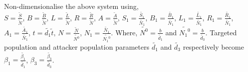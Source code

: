 \documentclass[conference]{IEEEtran}
\begin{document}
\noindent Non-dimensionalise the above system using,\\
\noindent
$S=\frac{\tilde{S}}{\tilde{N}}$, $B=\frac{\tilde{B}}{\tilde{N}}$, $L=\frac{\tilde{L}}{\tilde{N}}$, $R=\frac{\tilde{R}}{\tilde{N}}$,
$A=\frac{\tilde{A}}{\tilde{N}}$, $S_1=\frac{\tilde{S_1}}{\tilde{N_1}}$, $B_1=\frac{\tilde{B_1}}{\tilde{N_1}}$, $L_1=\frac{\tilde{L_1}}{\tilde{N_1}}$,
$R_1=\frac{\tilde{R_1}}{\tilde{N_1}}$, $A_1=\frac{\tilde{A_1}}{\tilde{N_1}}$, $t=\tilde{d_1}\tilde{t}$, $N=\frac{\tilde{N}}{\tilde{N^0}}$,
$N_1=\frac{\tilde{N_1}}{\tilde{{N_1}^0}}$.
Where, $\tilde{N^0}=\frac{b}{\tilde{d_1}}$ and $\tilde{{N_1}^0}=\frac{b}{\tilde{d_3}}$. Targeted population and attacker population parameters $\tilde{d_1}$ and $\tilde{d_3}$ respectively become $\beta_1=\frac{\tilde{\beta_1}}{\tilde{d_1}}$, $\beta_3=\frac{\tilde{\beta_3}}{\tilde{d_3}}$.
\end{document}
